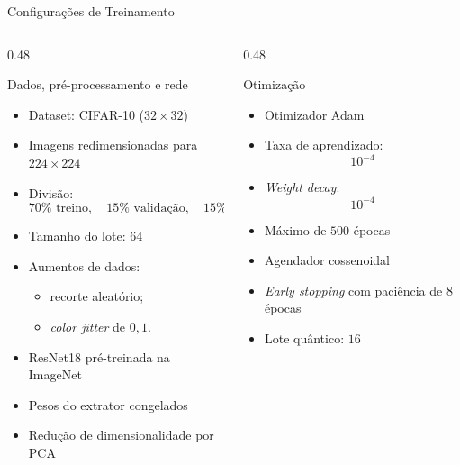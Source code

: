\begin{frame}{Configurações de Treinamento}

\begin{columns}[T,onlytextwidth]

\begin{column}{0.48\textwidth}

\begin{block}{Dados, pré-processamento e rede}
\begin{itemize}
  \item Dataset: CIFAR-10 ($32\times32$)
  \item Imagens redimensionadas para $224\times224$
  \item Divisão:
  \[
    70\% \text{ treino},\quad
    15\% \text{ validação},\quad
    15\% \text{ teste}
  \]
  \item Tamanho do lote: $64$
  \item Aumentos de dados:
  \begin{itemize}
    \item recorte aleatório;
    \item \textit{color jitter} de $0{,}1$.
  \end{itemize}

  \item ResNet18 pré-treinada na ImageNet
  \item Pesos do extrator congelados
  \item Redução de dimensionalidade por PCA

\end{itemize}
\end{block}

\end{column}

\begin{column}{0.48\textwidth}

\begin{block}{Otimização}
\begin{itemize}
  \item Otimizador Adam
  \item Taxa de aprendizado:
  \[
    10^{-4}
  \]
  \item \textit{Weight decay}:
  \[
    10^{-4}
  \]
  \item Máximo de $500$ épocas
  \item Agendador cossenoidal
  \item \textit{Early stopping} com paciência de $8$ épocas
  \item Lote quântico: $16$
\end{itemize}
\end{block}

\end{column}

\end{columns}

\end{frame}

